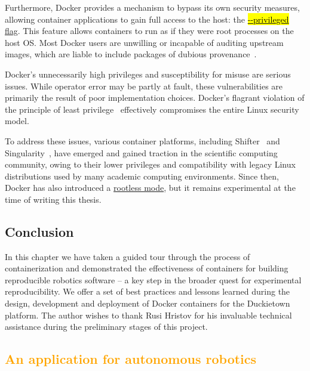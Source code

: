 \documentclass[12pt,initial,twoside,maitrise]{dms}
\newcommand{\mediumrare}[1]{\textcolor{orange}{#1}}
\newcommand{\inline}[1]{%
    \begingroup%
    \sethlcolor{slightgray}%
    \hl{\ttfamily\small #1}%
    \endgroup
}
\numberwithin{equation}{section}
\numberwithin{table}{chapter}
\numberwithin{figure}{chapter}
\begin{document}
Furthermore, Docker provides a mechanism to bypass its own security measures, allowing container applications to gain full access to the host: the \href{https://docs.docker.com/engine/reference/run/#security-configuration}{\inline{-{}-privileged} flag}. This feature allows containers to run as if they were root processes on the host OS. Most Docker users are unwilling or incapable of auditing upstream images, which are liable to include packages of dubious provenance~\citep{martin2018docker}.

Docker's unnecessarily high privileges and susceptibility for misuse are serious issues. While operator error may be partly at fault, these vulnerabilities are primarily the result of poor implementation choices. Docker's flagrant violation of the principle of least privilege~\citep{saltzer1975protection} effectively compromises the entire Linux security model.

To address these issues, various container platforms, including Shifter~\citep{gerhardt2017shifter} and Singularity~\citep{kurtzer2017singularity}, have emerged and gained traction in the scientific computing community, owing to their lower privileges and compatibility with legacy Linux distributions used by many academic computing environments. Since then, Docker has also introduced a \href{https://engineering.docker.com/2019/02/experimenting-with-rootless-docker/}{rootless mode}, but it remains experimental at the time of writing this thesis.

\section{Conclusion}

In this chapter we have taken a guided tour through the process of containerization and demonstrated the effectiveness of containers for building reproducible robotics software -- a key step in the broader quest for experimental reproducibility. We offer a set of best practices and lessons learned during the design, development and deployment of Docker containers for the Duckietown~\citep{paull2017duckietown} platform. The author wishes to thank Rusi Hristov for his invaluable technical assistance during the preliminary stages of this project.

\mediumrare{\chapter{An application for autonomous robotics}\label{ch:case-study}}
\end{document}
